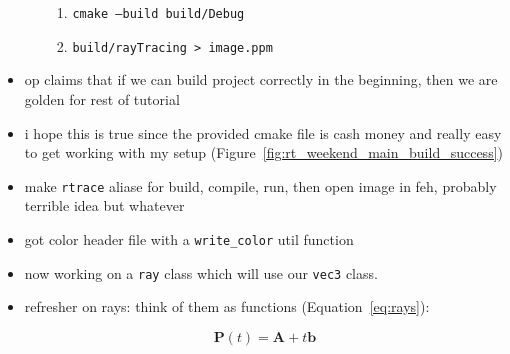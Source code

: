 \begin{itemize}
\begin{itemize}
\begin{enumerate}
                    \item \texttt{cmake --build build/Debug} 
                    \item \texttt{build/rayTracing > image.ppm} 
                \end{enumerate}
        \end{itemize}
    \item op claims that if we can build project correctly in the beginning,
        then we are golden for rest of tutorial
    \item i hope this is true since the provided cmake file is cash money and
        really easy to get working with my setup
        (Figure~\ref{fig:rt_weekend_main_build_success})
    \item make \texttt{rtrace} aliase for build, compile, run, then open image
        in feh, probably terrible idea but whatever 
    \item got color header file with a \texttt{write_color} util function
    \item now working on a \texttt{ray} class which will use our \texttt{vec3} 
        class.
    \item refresher on rays: think of them as functions 
        (Equation~\ref{eq:rays}):

        \begin{equation}
            \mathbf{P}(t) = \mathbf{A} + t\mathbf{b}
            \label{eq:rays}
        \end{equation}


\end{itemize}
